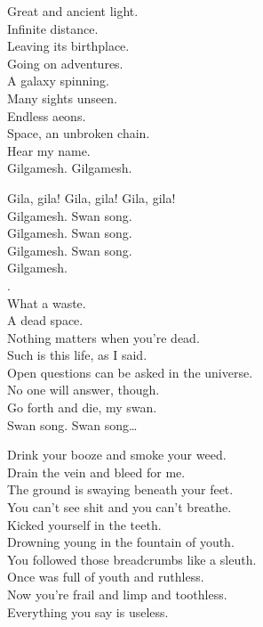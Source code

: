 Great and ancient light. \\
Infinite distance. \\
Leaving its birthplace. \\
Going on adventures. \\
A galaxy spinning. \\
Many sights unseen. \\
Endless aeons. \\
Space, an unbroken chain. \\
Hear my name. \\

Gilgamesh. Gilgamesh. \\


Gila, gila! Gila, gila! Gila, gila! \\

Gilgamesh. Swan song. \\
Gilgamesh. Swan song. \\
Gilgamesh. Swan song. \\

Gilgamesh. \\

. \\
What a waste. \\
A dead space. \\
Nothing matters when you're dead. \\
Such is this life, as I said. \\
Open questions can be asked in the universe. \\
No one will answer, though. \\
Go forth and die, my swan. \\

Swan song. Swan song… \\



Drink your booze and smoke your weed. \\
Drain the vein and bleed for me. \\
The ground is swaying beneath your feet. \\
You can't see shit and you can't breathe. \\
Kicked yourself in the teeth. \\
Drowning young in the fountain of youth. \\
You followed those breadcrumbs like a sleuth. \\
Once was full of youth and ruthless. \\
Now you're frail and limp and toothless. \\
Everything you say is useless. \\

